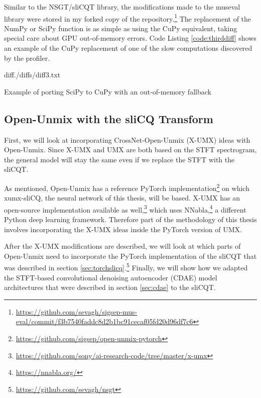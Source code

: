 \documentclass[report.tex]{subfiles}
\begin{document}
Similar to the NSGT/sliCQT library, the modifications made to the museval library were stored in my forked copy of the repository.\footnote{\url{https://github.com/sevagh/sigsep-mus-eval/commit/f3b7540faddc8d2b1bc91cecaf05fd20d96df7c6}} The replacement of the NumPy or SciPy function is as simple as using the CuPy equivalent, taking special care about GPU out-of-memory errors. Code Listing \ref{code:thirddiff} shows an example of the CuPy replacement of one of the slow computations discovered by the profiler.

\begin{listing}[ht]
  \centering
\begin{inputminted}[linenos,breaklines,frame=single,fontsize=\scriptsize]{diff}{./diffs/diff3.txt}
\end{inputminted}
  \caption{Example of porting SciPy to CuPy with an out-of-memory fallback}
  \label{code:thirddiff}
\end{listing}

\newpagefill

\subsection{Open-Unmix with the sliCQ Transform}
\label{sec:slicqumx}

First, we will look at incorporating CrossNet-Open-Unmix (X-UMX) ideas with Open-Unmix. Since X-UMX and UMX are both based on the STFT spectrogram, the general model will stay the same even if we replace the STFT with the sliCQT.

As mentioned, Open-Unmix has a reference PyTorch implementation\footnote{\url{https://github.com/sigsep/open-unmix-pytorch}} on which xumx-sliCQ, the neural network of this thesis, will be based. X-UMX has an open-source implementation available as well,\footnote{\url{https://github.com/sony/ai-research-code/tree/master/x-umx}} which uses NNabla,\footnote{\url{https://nnabla.org/}} a different Python deep learning framework. Therefore part of the methodology of this thesis involves incorporating the X-UMX ideas inside the PyTorch version of UMX.

After the X-UMX modifications are described, we will look at which parts of Open-Unmix need to incorporate the PyTorch implementation of the sliCQT that was described in section \ref{sec:torchslicq}.\footnote{\url{https://github.com/sevagh/nsgt}} Finally, we will show how we adapted the STFT-based convolutional denoising autoencoder (CDAE) model architectures that were described in section \ref{sec:cdae} to the sliCQT.
\end{document}
